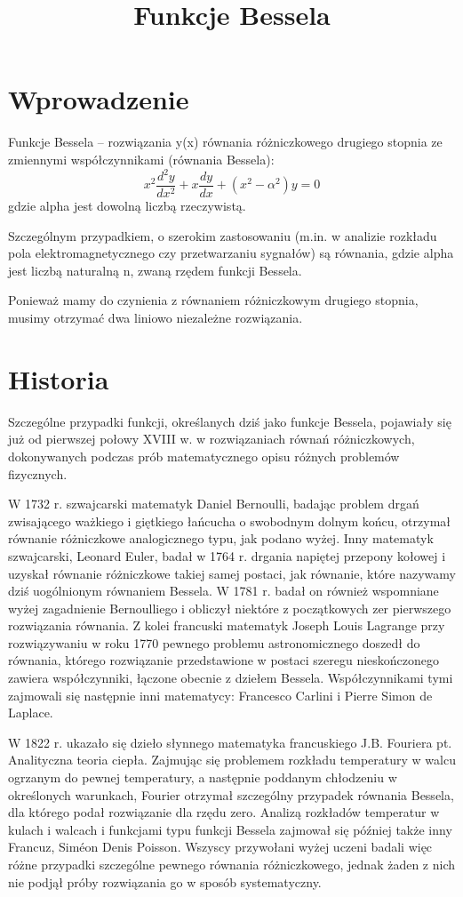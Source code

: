 \documentclass{article}
\begin{document}
\title{Funkcje Bessela}
\maketitle

\section*{Wprowadzenie}
Funkcje Bessela – rozwiązania y(x) równania różniczkowego drugiego stopnia ze zmiennymi współczynnikami (równania Bessela):
\[ x^{2}{\frac {d^{2}y}{dx^{2}}}+x{\frac {dy}{dx}}+(x^{2}-\alpha ^{2})y=0 \]
gdzie alpha jest dowolną liczbą rzeczywistą. 

Szczególnym przypadkiem, o szerokim zastosowaniu (m.in. w analizie rozkładu pola elektromagnetycznego czy przetwarzaniu sygnałów) są równania, gdzie alpha jest liczbą naturalną n, zwaną rzędem funkcji Bessela.

Ponieważ mamy do czynienia z równaniem różniczkowym drugiego stopnia, musimy otrzymać dwa liniowo niezależne rozwiązania. 

\section*{Historia}
Szczególne przypadki funkcji, określanych dziś jako funkcje Bessela, pojawiały się już od pierwszej połowy XVIII w. w rozwiązaniach równań różniczkowych, dokonywanych podczas prób matematycznego opisu różnych problemów fizycznych.

W 1732 r. szwajcarski matematyk Daniel Bernoulli, badając problem drgań zwisającego ważkiego i giętkiego łańcucha o swobodnym dolnym końcu, otrzymał równanie różniczkowe analogicznego typu, jak podano wyżej. Inny matematyk szwajcarski, Leonard Euler, badał w 1764 r. drgania napiętej przepony kołowej i uzyskał równanie różniczkowe takiej samej postaci, jak równanie, które nazywamy dziś uogólnionym równaniem Bessela. W 1781 r. badał on również wspomniane wyżej zagadnienie Bernoulliego i obliczył niektóre z początkowych zer pierwszego rozwiązania równania. Z kolei francuski matematyk Joseph Louis Lagrange przy rozwiązywaniu w roku 1770 pewnego problemu astronomicznego doszedł do równania, którego rozwiązanie przedstawione w postaci szeregu nieskończonego zawiera współczynniki, łączone obecnie z dziełem Bessela. Współczynnikami tymi zajmowali się następnie inni matematycy: Francesco Carlini i Pierre Simon de Laplace.

W 1822 r. ukazało się dzieło słynnego matematyka francuskiego J.B. Fouriera pt. Analityczna teoria ciepła. Zajmując się problemem rozkładu temperatury w walcu ogrzanym do pewnej temperatury, a następnie poddanym chłodzeniu w określonych warunkach, Fourier otrzymał szczególny przypadek równania Bessela, dla którego podał rozwiązanie dla rzędu zero. Analizą rozkładów temperatur w kulach i walcach i funkcjami typu funkcji Bessela zajmował się później także inny Francuz, Siméon Denis Poisson. Wszyscy przywołani wyżej uczeni badali więc różne przypadki szczególne pewnego równania różniczkowego, jednak żaden z nich nie podjął próby rozwiązania go w sposób systematyczny.
\end{document}
